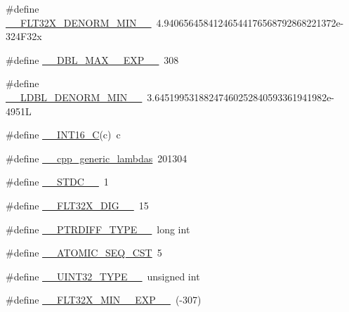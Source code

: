 \begin{DoxyCompactItemize}
\item 
\#define \hyperlink{cmake-build-debug_2babel__client__autogen_2moc__predefs_8h_ab557192dd4e486a262d4495e29fe356d}{\+\_\+\+\_\+\+F\+L\+T32\+X\+\_\+\+D\+E\+N\+O\+R\+M\+\_\+\+M\+I\+N\+\_\+\+\_\+}~4.\+94065645841246544176568792868221372e-\/324\+F32x
\item 
\#define \hyperlink{cmake-build-debug_2babel__client__autogen_2moc__predefs_8h_a280f0a9058cc03c2dac890a19881b1fb}{\+\_\+\+\_\+\+D\+B\+L\+\_\+\+M\+A\+X\+\_\+\_\+\+E\+X\+P\+\_\+\+\_\+}~308
\item 
\#define \hyperlink{cmake-build-debug_2babel__client__autogen_2moc__predefs_8h_a5436993e3c0ddb7caee4b9b01021cde4}{\+\_\+\+\_\+\+L\+D\+B\+L\+\_\+\+D\+E\+N\+O\+R\+M\+\_\+\+M\+I\+N\+\_\+\+\_\+}~3.\+64519953188247460252840593361941982e-\/4951L
\item 
\#define \hyperlink{cmake-build-debug_2babel__client__autogen_2moc__predefs_8h_acefa39ff476ff22ce343809fff1e8bc1}{\+\_\+\+\_\+\+I\+N\+T16\+\_\+C}(c)~c
\item 
\#define \hyperlink{cmake-build-debug_2babel__client__autogen_2moc__predefs_8h_a57e1156511d5ca1e45a5505f24518c87}{\+\_\+\+\_\+cpp\+\_\+generic\+\_\+lambdas}~201304
\item 
\#define \hyperlink{cmake-build-debug_2babel__client__autogen_2moc__predefs_8h_a8bdd19cad331a646ae8375be00e34cb3}{\+\_\+\+\_\+\+S\+T\+D\+C\+\_\+\+\_\+}~1
\item 
\#define \hyperlink{cmake-build-debug_2babel__client__autogen_2moc__predefs_8h_a9875b8f50cd7d288819635ebf494cf3d}{\+\_\+\+\_\+\+F\+L\+T32\+X\+\_\+\+D\+I\+G\+\_\+\+\_\+}~15
\item 
\#define \hyperlink{cmake-build-debug_2babel__client__autogen_2moc__predefs_8h_a726a020189392103a9404da070536e07}{\+\_\+\+\_\+\+P\+T\+R\+D\+I\+F\+F\+\_\+\+T\+Y\+P\+E\+\_\+\+\_\+}~long int
\item 
\#define \hyperlink{cmake-build-debug_2babel__client__autogen_2moc__predefs_8h_a0609dc2b702d5980de44c01bd373136a}{\+\_\+\+\_\+\+A\+T\+O\+M\+I\+C\+\_\+\+S\+E\+Q\+\_\+\+C\+ST}~5
\item 
\#define \hyperlink{cmake-build-debug_2babel__client__autogen_2moc__predefs_8h_af4eb6c3c4da52a7fe202626ac4dc360e}{\+\_\+\+\_\+\+U\+I\+N\+T32\+\_\+\+T\+Y\+P\+E\+\_\+\+\_\+}~unsigned int
\item 
\#define \hyperlink{cmake-build-debug_2babel__client__autogen_2moc__predefs_8h_a29e106a0e6600792357f526e30ca98b1}{\+\_\+\+\_\+\+F\+L\+T32\+X\+\_\+\+M\+I\+N\+\_\+\_\+\+E\+X\+P\+\_\+\+\_\+}~(-\/307)
\item 

\end{DoxyCompactItemize}
